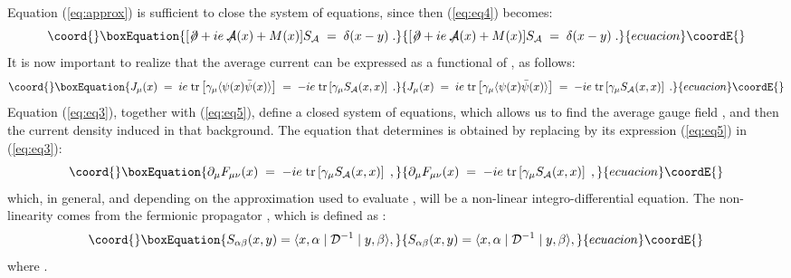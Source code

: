\documentclass[a4paper,12pt]{article}
\begin{document}
{{Equation (\ref{eq:approx}) is sufficient to close the system of
equations, since then (\ref{eq:eq4}) becomes:
\begin{equation}\coord{}\boxEquation{
   \label{eq:eq4ap}
[\not\! \partial + i e \not\!\!{\mathcal A}(x) + M(x)] S_{{\mathcal A}}\;=\; \delta (x-y) \;.
}{
   [\not\! \partial + i e \not\!\!{\mathcal A}(x) + M(x)] S_{{\mathcal A}}\;=\; \delta (x-y) \;.
}{ecuacion}\coordE{}\end{equation}
It is now important to realize that the average current can be
expressed as a functional of \coordHE{}, as follows:
\begin{equation}\coord{}\boxEquation{
   \label{eq:eq5}
J_\mu (x) \;=\;i e\; {\rm tr}\left[\gamma_\mu \langle \psi(x){\bar\psi}(x)\rangle \right] \;=\;
- i e\; {\rm tr} \left[\gamma_\mu S_{\mathcal A}(x,x) \right] \;.
}{
   J_\mu (x) \;=\;i e\; {\rm tr}\left[\gamma_\mu \langle \psi(x){\bar\psi}(x)\rangle \right] \;=\;
- i e\; {\rm tr} \left[\gamma_\mu S_{\mathcal A}(x,x) \right] \;.
}{ecuacion}\coordE{}\end{equation}
Equation (\ref{eq:eq3}), together with (\ref{eq:eq5}), define a closed
system of equations, which allows us to find the average gauge field
\coordHE{}, and then the current density induced in that
background.  The equation that determines \coordHE{} is obtained
by replacing \coordHE{} by its expression (\ref{eq:eq5}) in
(\ref{eq:eq3}):
\begin{equation}\coord{}\boxEquation{
   \label{eq:eqa}
\partial_\mu F_{\mu\nu}(x)\;=\;-i e\; {\rm tr} \left[\gamma_\mu S_{\mathcal A}(x,x)\right] \;,
}{
   \partial_\mu F_{\mu\nu}(x)\;=\;-i e\; {\rm tr} \left[\gamma_\mu S_{\mathcal A}(x,x)\right] \;,
}{ecuacion}\coordE{}\end{equation}
which, in general, and depending on the approximation used to evaluate
\coordHE{}, will be a non-linear integro-differential equation.
The non-linearity comes from the fermionic propagator \coordHE{}, which is defined as :
\begin{equation}\coord{}\boxEquation{
S_{\alpha\beta}(x,y)=\langle x,\alpha \mid {\mathcal D}^{-1} \mid y, \beta \rangle ,
}{
S_{\alpha\beta}(x,y)=\langle x,\alpha \mid {\mathcal D}^{-1} \mid y, \beta \rangle ,
}{ecuacion}\coordE{}\end{equation}
where \coordHE{}.


}}
\end{document}
